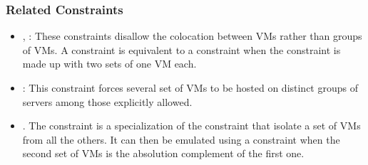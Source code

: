 \subsubsection{Related Constraints}
\begin{itemize}
\item {}, : These constraints
disallow the colocation between VMs rather than groups of VMs.
A  constraint is equivalent to a  constraint when the  constraint is made up with two sets of one VM each.
\item {}: This constraint forces several set of VMs to be hosted on distinct groups of servers among those explicitly allowed.
\item {}. The  constraint is a specialization of the  constraint that isolate a set of VMs from all the others. It can then be emulated using a  constraint when the second set of VMs is the absolution complement of the first one.
\end{itemize}

